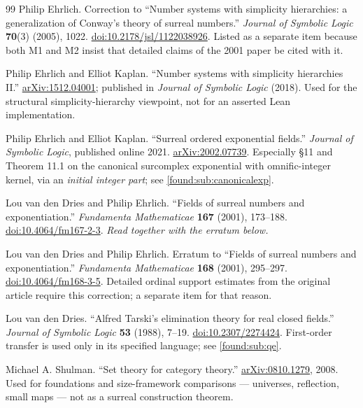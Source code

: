 \documentclass[11pt,letterpaper]{article}
\numberwithin{equation}{section}
\theoremstyle{definition}
\theoremstyle{remark}
\begin{document}
\begin{thebibliography}{99}
Philip Ehrlich. Correction to ``Number systems with simplicity hierarchies: a
generalization of Conway's theory of surreal numbers.'' \emph{Journal of Symbolic
Logic} \textbf{70}(3) (2005), 1022.
\href{https://doi.org/10.2178/jsl/1122038926}{doi:10.2178/jsl/1122038926}.
Listed as a separate item because both M1 and M2 insist that detailed claims of
the 2001 paper be cited with it.

Philip Ehrlich and Elliot Kaplan. ``Number systems with simplicity hierarchies
II.'' \href{https://arxiv.org/abs/1512.04001}{arXiv:1512.04001}; published in
\emph{Journal of Symbolic Logic} (2018). Used for the structural
simplicity-hierarchy viewpoint, not for an asserted Lean implementation.

Philip Ehrlich and Elliot Kaplan. ``Surreal ordered exponential fields.''
\emph{Journal of Symbolic Logic}, published online 2021.
\href{https://arxiv.org/abs/2002.07739}{arXiv:2002.07739}. Especially \S11 and
Theorem 11.1 on the canonical surcomplex exponential with omnific-integer
kernel, via an \emph{initial integer part}; see \cref{found:sub:canonicalexp}.

Lou van den Dries and Philip Ehrlich. ``Fields of surreal numbers and
exponentiation.'' \emph{Fundamenta Mathematicae} \textbf{167} (2001), 173--188.
\href{https://doi.org/10.4064/fm167-2-3}{doi:10.4064/fm167-2-3}. \emph{Read
together with the erratum below.}

Lou van den Dries and Philip Ehrlich. Erratum to ``Fields of surreal numbers and
exponentiation.'' \emph{Fundamenta Mathematicae} \textbf{168} (2001), 295--297.
\href{https://doi.org/10.4064/fm168-3-5}{doi:10.4064/fm168-3-5}. Detailed
ordinal support estimates from the original article require this correction; a
separate item for that reason.

Lou van den Dries. ``Alfred Tarski's elimination theory for real closed fields.''
\emph{Journal of Symbolic Logic} \textbf{53} (1988), 7--19.
\href{https://doi.org/10.2307/2274424}{doi:10.2307/2274424}. First-order transfer
is used only in its specified language; see \cref{found:sub:qe}.

Michael A. Shulman. ``Set theory for category theory.''
\href{https://arxiv.org/abs/0810.1279}{arXiv:0810.1279}, 2008. Used for
foundations and size-framework comparisons --- universes, reflection, small maps
--- not as a surreal construction theorem.


\end{thebibliography}
\end{document}

